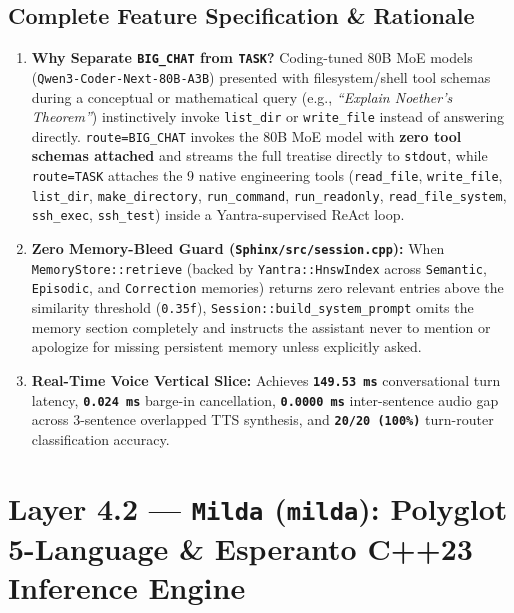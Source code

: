\documentclass[11pt,a4paper]{article}
\begin{document}
\subsection{Complete Feature Specification \& Rationale}
\begin{enumerate}[leftmargin=1.5em]
  \item \textbf{Why Separate \texttt{BIG\_CHAT} from \texttt{TASK}?} Coding-tuned 80B MoE models (\texttt{Qwen3-Coder-Next-80B-A3B}) presented with filesystem/shell tool schemas during a conceptual or mathematical query (e.g., \emph{``Explain Noether's Theorem''}) instinctively invoke \texttt{list\_dir} or \texttt{write\_file} instead of answering directly. \texttt{route=BIG\_CHAT} invokes the 80B MoE model with \textbf{zero tool schemas attached} and streams the full treatise directly to \texttt{stdout}, while \texttt{route=TASK} attaches the 9 native engineering tools (\texttt{read\_file}, \texttt{write\_file}, \texttt{list\_dir}, \texttt{make\_directory}, \texttt{run\_command}, \texttt{run\_readonly}, \texttt{read\_file\_system}, \texttt{ssh\_exec}, \texttt{ssh\_test}) inside a Yantra-supervised ReAct loop.
  \item \textbf{Zero Memory-Bleed Guard (\texttt{Sphinx/src/session.cpp}):} When \texttt{MemoryStore::retrieve} (backed by \texttt{Yantra::HnswIndex} across \texttt{Semantic}, \texttt{Episodic}, and \texttt{Correction} memories) returns zero relevant entries above the similarity threshold (\texttt{0.35f}), \texttt{Session::build\_system\_prompt} omits the memory section completely and instructs the assistant never to mention or apologize for missing persistent memory unless explicitly asked.
  \item \textbf{Real-Time Voice Vertical Slice:} Achieves \textbf{\texttt{149.53 ms}} conversational turn latency, \textbf{\texttt{0.024 ms}} barge-in cancellation, \textbf{\texttt{0.0000 ms}} inter-sentence audio gap across 3-sentence overlapped TTS synthesis, and \textbf{\texttt{20/20 (100\%)}} turn-router classification accuracy.
\end{enumerate}

\section{Layer 4.2 --- \texttt{Milda} (\texttt{milda}): Polyglot 5-Language \& Esperanto C++23 Inference Engine}
\end{document}
